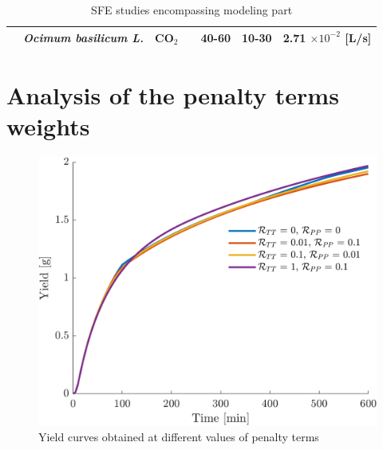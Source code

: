 \documentclass[a4paper,fleqn]{cas-dc}
\begin{document}
\begin{table}[h!]
{\begin{tabular}{|p{2.5cm}|p{2cm}|p{1.75cm}|p{4.5cm}|p{1.5cm}|p{1.5cm}|p{3cm}|}
		\citet{Zekovic2014} & \textit{Ocimum basilicum L.} & CO$_2$ & \citet{Brunner1994} \newline \citet{Kandiah1990} \newline \citet{Esquivel1999} &  40-60  & 10-30 & 2.71 $\times 10^{-2}$ [L/s]\\ \hline
	\end{tabular} }
	\caption{SFE studies encompassing modeling part}
	\label{fig: SFE_Literature}
\end{table}

\newpage
\twocolumn
\section{Analysis of the penalty terms weights} \label{CH: Penalty_Terms}

\begin{figure}[!ht]
	\centering
	\includegraphics[trim = 0.0cm 0.0cm 0.0cm 0.0cm,clip,width=0.9\columnwidth]{Figures/Results/Y_Penalty_Analysis.png}
	\caption{Yield curves obtained at different values of penalty terms}
	\label{fig:Penalty_Analysis_Y}
\end{figure}
\end{document}
